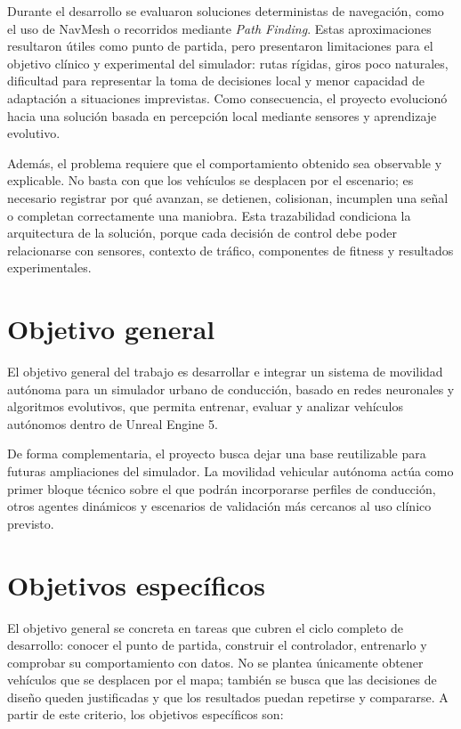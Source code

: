 Durante el desarrollo se evaluaron soluciones deterministas de navegación, como el uso de NavMesh o recorridos mediante \textit{Path Finding}. Estas aproximaciones resultaron útiles como punto de partida, pero presentaron limitaciones para el objetivo clínico y experimental del simulador: rutas rígidas, giros poco naturales, dificultad para representar la toma de decisiones local y menor capacidad de adaptación a situaciones imprevistas. Como consecuencia, el proyecto evolucionó hacia una solución basada en percepción local mediante sensores y aprendizaje evolutivo.

Además, el problema requiere que el comportamiento obtenido sea observable y explicable. No basta con que los vehículos se desplacen por el escenario; es necesario registrar por qué avanzan, se detienen, colisionan, incumplen una señal o completan correctamente una maniobra. Esta trazabilidad condiciona la arquitectura de la solución, porque cada decisión de control debe poder relacionarse con sensores, contexto de tráfico, componentes de fitness y resultados experimentales.

\section{Objetivo general}

El objetivo general del trabajo es desarrollar e integrar un sistema de movilidad autónoma para un simulador urbano de conducción, basado en redes neuronales y algoritmos evolutivos, que permita entrenar, evaluar y analizar vehículos autónomos dentro de Unreal Engine 5.

De forma complementaria, el proyecto busca dejar una base reutilizable para futuras ampliaciones del simulador. La movilidad vehicular autónoma actúa como primer bloque técnico sobre el que podrán incorporarse perfiles de conducción, otros agentes dinámicos y escenarios de validación más cercanos al uso clínico previsto.

\section{Objetivos específicos}

El objetivo general se concreta en tareas que cubren el ciclo completo de desarrollo: conocer el punto de partida, construir el controlador, entrenarlo y comprobar su comportamiento con datos. No se plantea únicamente obtener vehículos que se desplacen por el mapa; también se busca que las decisiones de diseño queden justificadas y que los resultados puedan repetirse y compararse. A partir de este criterio, los objetivos específicos son:

